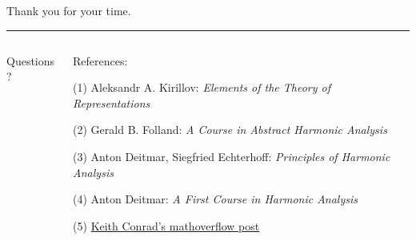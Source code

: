 \documentclass[mathserif
, handout
]{beamer}
\begin{document}
\begin{frame}
    \begin{flushright}
        {\color{darkgold60}Thank you for your time.}
        \end{flushright}
        \hrule\pause
    \begin{columns}
    \begin{column}{0.3\textwidth}
        \begin{block}{}{
        \begin{center}\Large  Questions?\end{center}}
        \end{block}\vspace{0em}
    \end{column}
    \begin{column}{0.7\textwidth}
        \begin{block}{}{
        \begin{center}\Large  References:\end{center}}
    \end{block}
(1) Aleksandr A. Kirillov: \textit{Elements of the Theory of Representations}

(2) Gerald B. Folland: \textit{A Course in Abstract Harmonic Analysis}

(3) Anton Deitmar, Siegfried Echterhoff: \textit{Principles of Harmonic Analysis}

(4) Anton Deitmar: \textit{A First Course in Harmonic Analysis}

(5) \textcolor{blue}{\href{https://mathoverflow.net/a/89520}{Keith Conrad's mathoverflow post}}%
    \end{column}
    \end{columns}
\end{frame}

\end{document}
